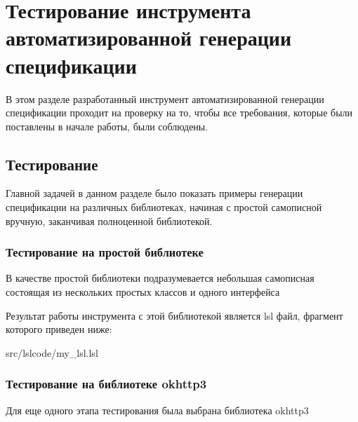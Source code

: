 \chapter{Тестирование инструмента автоматизированной генерации спецификации}

В этом разделе разработанный инструмент автоматизированной генерации спецификации проходит на проверку на то, чтобы все требования, которые были поставлены в начале работы, были соблюдены.

\section{Тестирование}

Главной задачей в данном разделе было показать примеры генерации спецификации на различных библиотеках, начиная с простой самописной вручную, заканчивая полноценной библиотекой.

\subsection{Тестирование на простой библиотеке}

В качестве простой библиотеки подразумевается небольшая самописная состоящая из нескольких простых классов и одного интерфейса

Результат работы инструмента с этой библиотекой является lsl файл, фрагмент которого приведен ниже:

{src/lslcode/my_lsl.lsl}

\subsection{Тестирование на библиотеке okhttp3}

Для еще одного этапа тестирования была выбрана библиотека okhttp3

